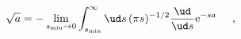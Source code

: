 \begin{equation}
\sqrt{a} = - \lim\limits_{s_{\text{min}} \rightarrow 0}
\int_{s_{\text{min}} }^\infty \ud s\, (\pi s)^{-1/2}
\frac{\ud}{\ud s} \text{e}^{-sa} \hspace{0.5cm},
\end{equation}

